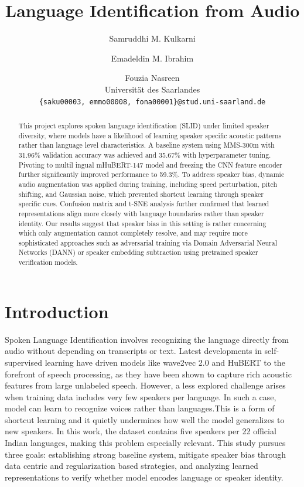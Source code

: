 \documentclass[11pt]{article}
\title{Language Identification from Audio}
\author{
  Samruddhi M. Kulkarni \and
  Emadeldin M. Ibrahim \and
  Fouzia Nasreen \\
  Universität des Saarlandes \\
  \texttt{\{saku00003, emmo00008, fona00001\}@stud.uni-saarland.de}
}
\begin{document}
\maketitle


\begin{abstract}
This project explores spoken language identification (SLID) under limited speaker diversity, where models have a likelihood of learning speaker specific acoustic patterns rather than language level characteristics. A baseline system using MMS-300m with 31.96\% validation accuracy was achieved and 35.67\% with hyperparameter tuning.  Pivoting to multil ingual mHuBERT-147 model and freezing the CNN feature encoder further significantly improved performance to 59.3\%. To address speaker bias, dynamic audio augmentation was applied during training, including speed perturbation, pitch shifting, and Gaussian noise, which prevented shortcut learning through speaker specific cues. Confusion matrix and t-SNE analysis further confirmed that learned representations align more closely with language boundaries rather than speaker identity. Our results suggest that speaker bias in this setting is rather concerning which only augmentation cannot completely resolve, and may require more sophisticated approaches such as adversarial training via Domain Adversarial Neural Networks (DANN) or speaker embedding subtraction using pretrained speaker verification models.
\end{abstract}

\section{Introduction}

Spoken Language Identification involves recognizing the language directly from audio without depending on transcripts or text. Latest developments in self-supervised learning have driven models like wave2vec 2.0 \cite{baevski2020wav2vec20frameworkselfsupervised} and HuBERT \cite{hsu2021hubertselfsupervisedspeechrepresentation} to the forefront of speech processing, as they have been shown to capture rich acoustic features from large unlabeled speech.
However, a less explored challenge arises when training data includes very few speakers per language. In such a case, model can learn to recognize voices rather than languages.This is a form of shortcut learning \cite{Geirhos_2020} and it quietly undermines how well the model generalizes to new speakers.
In this work, the dataset contains five speakers per 22 official Indian languages, making this problem especially relevant. This study pursues three goals: establishing strong baseline system, mitigate speaker bias through data centric and regularization based strategies, and analyzing learned representations to verify whether model encodes language or speaker identity.
\end{document}

